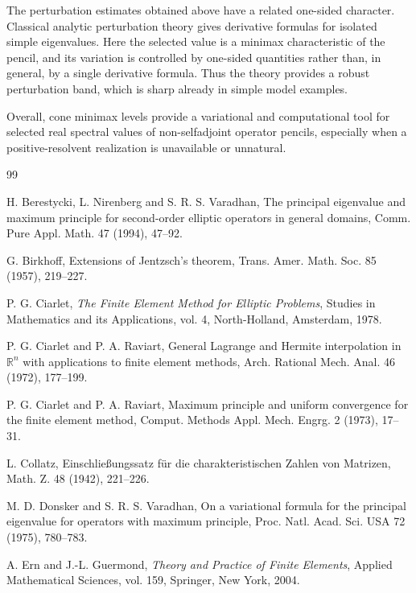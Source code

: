 \documentclass[preprint,10pt]{elsarticle}
\theoremstyle{plain}
\theoremstyle{definition}
\theoremstyle{remark}
\begin{document}
The perturbation estimates obtained above have a related one-sided character.
Classical analytic perturbation theory gives derivative formulas for isolated
simple eigenvalues. Here the selected value is a minimax characteristic of
the pencil, and its variation is controlled by one-sided quantities rather
than, in general, by a single derivative formula. Thus the theory provides a
robust perturbation band, which is sharp already in simple model examples.

Overall, cone minimax levels provide a variational and computational tool for
selected real spectral values of non-selfadjoint operator pencils, especially
when a positive-resolvent realization is unavailable or unnatural.

\begin{thebibliography}{99}
	
	H. Berestycki, L. Nirenberg and S. R. S. Varadhan,
	The principal eigenvalue and maximum principle for second-order elliptic
	operators in general domains,
	Comm. Pure Appl. Math. 47 (1994), 47--92.
	
	G. Birkhoff,
	Extensions of Jentzsch's theorem,
	Trans. Amer. Math. Soc. 85 (1957), 219--227.
	
	P. G. Ciarlet,
	\textit{The Finite Element Method for Elliptic Problems},
	Studies in Mathematics and its Applications, vol. 4,
	North-Holland, Amsterdam, 1978.
	
	P. G. Ciarlet and P. A. Raviart,
	General Lagrange and Hermite interpolation in \(\mathbb R^n\) with applications
	to finite element methods,
	Arch. Rational Mech. Anal. 46 (1972), 177--199.
	
	P. G. Ciarlet and P. A. Raviart,
	Maximum principle and uniform convergence for the finite element method,
	Comput. Methods Appl. Mech. Engrg. 2 (1973), 17--31.
	
	L. Collatz,
	Einschlie{\ss}ungssatz f{\"u}r die charakteristischen Zahlen von Matrizen,
	Math. Z. 48 (1942), 221--226.
	
	M. D. Donsker and S. R. S. Varadhan,
	On a variational formula for the principal eigenvalue for operators with
	maximum principle,
	Proc. Natl. Acad. Sci. USA 72 (1975), 780--783.
	
	A. Ern and J.-L. Guermond,
	\textit{Theory and Practice of Finite Elements},
	Applied Mathematical Sciences, vol. 159,
	Springer, New York, 2004.
	

\end{thebibliography}
\end{document}
